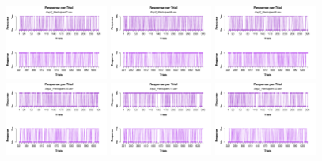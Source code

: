 \begin{figure}[th]
\includegraphics[width=0.30\textwidth]{Figures/Response_Exp2_P7} \includegraphics[width=0.30\textwidth]{Figures/Response_Exp2_P8} \includegraphics[width=0.30\textwidth]{Figures/Response_Exp2_P9}
\includegraphics[width=0.30\textwidth]{Figures/Response_Exp2_P10} \includegraphics[width=0.30\textwidth]{Figures/Response_Exp2_P11} \includegraphics[width=0.30\textwidth]{Figures/Response_Exp2_P12}

\end{figure}
